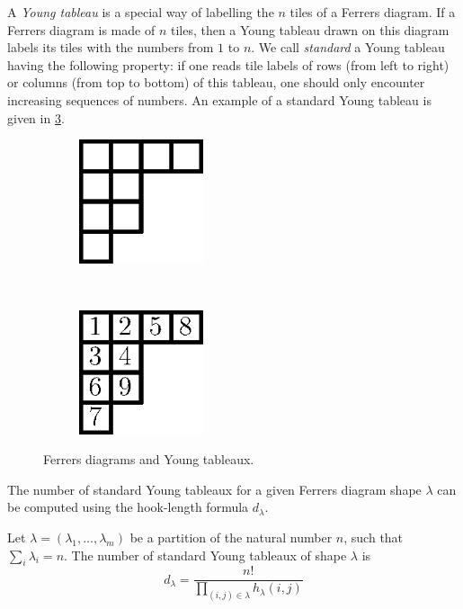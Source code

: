 A \emph{Young tableau} is a special way of labelling the \(n\) tiles of a Ferrers
diagram. If a Ferrers diagram is made of $n$ tiles, then a Young tableau drawn
on this diagram labels its tiles with the numbers from $1$ to $n$. We call
\emph{standard} a Young tableau having the following property:
if one reads tile labels of rows (from left to right) or
columns (from top to bottom) of this tableau, one should only encounter increasing sequences of
numbers. An example of a standard Young tableau is given in
\ref{fig:xy:lattice:young}.

\begin{figure}
\centering
\begin{subfigure}[t]{0.47\textwidth}
\centering
	\includegraphics[width=0.4\textwidth]{fig/x+y/lattice/ferrers}
	\label{fig:xy:lattice:ferrers}
\end{subfigure}
~
\begin{subfigure}[t]{0.47\textwidth}
\centering
	\includegraphics[width=0.4\textwidth]{fig/x+y/lattice/young}
	\label{fig:xy:lattice:young}
\end{subfigure}
\caption{Ferrers diagrams and Young tableaux.}
\end{figure}

The number of standard Young tableaux for a given Ferrers diagram shape
\(\lambda\) can be computed using the hook-length formula \(d_{\lambda}\).
\begin{theorem}
\label{theorem:xy:lattice:hook}
Let \(\lambda = (\lambda_1,\ldots,\lambda_m)\) be a partition of the natural
number \(n\), \ie such that \(\sum_i \lambda_i = n\). The number of standard
Young tableaux of shape \(\lambda\) is
\begin{displaymath}
d_{\lambda} = \frac{n!}{\prod_{(i,j) \in \lambda} h_{\lambda}(i,j)}
\end{displaymath}
\end{theorem}

